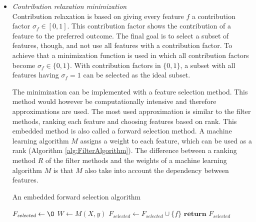 \documentclass[10pt,a4paper]{article}
\begin{document}
	
	\begin{itemize}
		\item \textit{Contribution relaxation minimization} \\
		
		Contribution relaxation is based on giving every feature $f$ a contribution factor $\sigma_f \in [0, 1]$. This contribution factor shows the contribution of a feature to the preferred outcome. The final goal is to select a subset of features, though, and not use all features with a contribution factor. To achieve that a minimization function is used in which all contribution factors become $\sigma_f \in \{0, 1\}$. With contribution factors in $\{0, 1\}$, a subset with all features having $\sigma_f = 1$ can be selected as the ideal subset\cite{Lal2006}. 
		
		The minimization can be implemented with a feature selection method. This method would however be computationally intensive and therefore approximations are used. The most used approximation is similar to the filter methods, ranking each feature and choosing features based on rank. This embedded method is also called a forward selection method. A machine learning algorithm $M$ assigns a weight to each feature, which can be used as a rank (Algorithm \ref{alg:FilterAlgorithm}). The difference between a ranking method $R$ of the filter methods and the weights of a machine learning algorithm $M$ is that $M$ also take into account the dependency between features\cite{Lal2006}.
		
		\begin{algorithm}[H]
			\caption{An embedded forward selection algorithm\cite{Lal2006}}\label{alg:EmbeddedForwardSelectionAlgorithm}
			\begin{algorithmic}[1]
				\State $F_{\textit{selected}} \gets \O$ 	
				\State $W \gets M(X, y)$					
				 					
							
				\State $F_{\textit{selected}} \gets F_{\textit{selected}} \cup \{f\}$ 
				\EndIf
				\EndFor
				\State $\textbf{return } F_{\textit{selected}}$
				\EndProcedure
			\end{algorithmic}
		\end{algorithm}
		

\end{itemize}
\end{document}
